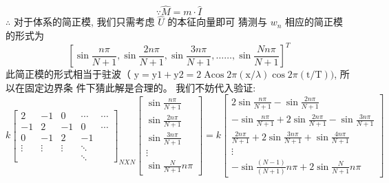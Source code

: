 \documentclass[11pt, a4paper, oneside]{ctexart}
\begin{document}
{{{\begin{appendices}
{$$
\because \hat{M}=m \cdot \hat{I}
$$
$\therefore$ 对于体系的简正模, 我们只需考虑 $\hat{U}$ 的本征向量即可 猜测与 $w_{n}$ 相应的简正模的形式为
$$
\left[\sin \frac{n \pi}{N+1}, \sin \frac{2 n \pi}{N+1}, \sin \frac{3 n \pi}{N+1}, \ldots \ldots, \sin \frac{N n \pi}{N+1}\right]^{T}
$$
此简正模的形式相当于驻波（ $\mathrm{y}=\mathrm{y} 1+\mathrm{y} 2=2 \operatorname{Acos} 2 \pi(\mathrm{x} / \lambda) \cos 2 \pi(\mathrm{t} / \mathrm{T}))$, 所以在固定边界条 件下猜此解是合理的。
我们不妨代入验证:
$$
k\left[\begin{array}{ccccc}
2 & -1 & 0 & \cdots & \cdots \\
-1 & 2 & -1 & 0 & \cdots \\
0 & -1 & 2 & -1 & \\
\vdots & \vdots & \vdots & \ddots & \\
& & & \ddots
\end{array}\right]_{N X N}\left[\begin{array}{c}
\sin \frac{n \pi}{N+1} \\
\sin \frac{2 n \pi}{N+1} \\
\sin \frac{3 n \pi}{N+1} \\
\vdots \\
\sin \frac{N}{N+1} n \pi
\end{array}\right]=k\left[\begin{array}{c}
2 \sin \frac{n \pi}{N+1}-\sin \frac{2 n \pi}{N+1} \\
-\sin \frac{n \pi}{N+1}+2 \sin \frac{2 n \pi}{N+1}-\sin \frac{3 n \pi}{N+1} \\
\frac{2 n \pi}{N+1}+2 \sin \frac{3 n \pi}{N+1}+\sin \frac{4 n \pi}{N+1} \\
\vdots \\
-\sin \frac{(N-1)}{(N+1)} n \pi+2 \sin \frac{N}{N+1} n \pi
\end{array}\right]
$$

}
\end{appendices}}}}
\end{document}
